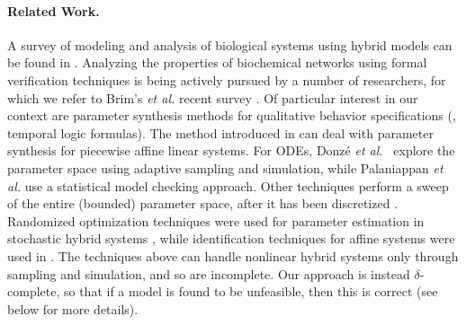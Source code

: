 \paragraph{Related Work.}
A survey of modeling and analysis of biological systems using hybrid models can be found in \cite{luca08}.
Analyzing the properties of biochemical networks using formal verification techniques is being actively
pursued by a number of researchers, for which we refer to Brim's {\em et al.} recent 
survey \cite{BrimSFM13}.
Of particular interest in our context are parameter synthesis methods for qualitative behavior 
specifications (\eg, temporal logic formulas). The method introduced in \cite{rovergene} can deal 
with parameter synthesis for piecewise affine linear systems. For ODEs, 
Donz\'{e} {\em et al.}~\cite{donze} explore the parameter space using adaptive sampling and simulation, 
while Palaniappan {\em et al.} \cite{liu13} use a statistical 
model checking approach. Other techniques perform a sweep of the entire (bounded) parameter space, 
after it has been discretized \cite{Calzone06,Donaldson08}. Randomized optimization techniques were used
for parameter estimation in stochastic hybrid systems \cite{Koutroumpas08}, while identification
techniques for affine systems were used in \cite{Cinquemani08}.
The techniques above can handle nonlinear hybrid systems only through sampling and 
simulation, and so are incomplete. Our approach is instead $\delta$-complete, so that if a model 
is found to be unfeasible, then this is correct (see below for more details).


